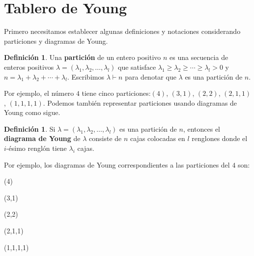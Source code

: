 \documentclass[12pt]{book}
\theoremstyle{definition}
\newtheorem{definition}[theorem]{Definición}
\newcounter{in}
\newcounter{ini}
\begin{document}
\section{Tablero de Young}
\label{tablero}

Primero necesitamos establecer algunas definiciones y notaciones
considerando particiones y diagramas de Young.

\begin{definition}
  Una \textbf{partición} de un entero positivo $n$ es una secuencia de
  enteros positivos
  $\lambda=(\lambda_{1},\lambda_{2},\ldots,\lambda_{l})$ que satisface
  $\lambda_{1}\geq\lambda_{2}\geq\cdots\geq\lambda_{l}>0$ y
  $n=\lambda_{1}+\lambda_{2}+\cdots+\lambda_{l}$. Escribimos
  $\lambda\vdash n$ para denotar que $\lambda$ es una partición de $n$.
\end{definition}

Por ejemplo, el número $4$ tiene cinco particiones:$(4)$, $(3,1)$,
$(2,2)$, $(2,1,1)$, $(1,1,1,1)$. Podemos también representar
particiones usando diagramas de Young como sigue.

\begin{definition}
  Si $\lambda=(\lambda_{1},\lambda_{2},\ldots,\lambda_{l})$ es una
  partición de $n$, entonces el \textbf{diagrama de Young} de $\lambda$
  consiste de $n$ cajas colocadas en $l$ renglones donde el $i$-ésimo
  renglón tiene  $\lambda_{i}$ cajas.
\end{definition}

Por ejemplo, los diagramas de Young correspondientes a las particiones
del $4$ son: 

\begin{center}
  \begin{minipage}[h]{0.2\linewidth}
    \centering {}\bigskip

    (4)
  \end{minipage}
  \begin{minipage}[h]{0.15\linewidth}
    \centering {}\medskip

    (3,1)
  \end{minipage}
  \begin{minipage}[h]{0.15\linewidth}
    \centering {}\medskip

    (2,2)
  \end{minipage}
  \begin{minipage}[h]{0.15\linewidth}
    \centering {}\smallskip

    (2,1,1)
  \end{minipage}
  \begin{minipage}[h]{0.15\linewidth}
    \centering {}\smallskip

    (1,1,1,1)
  \end{minipage}
\end{center}
\end{document}
